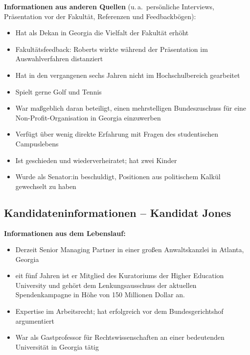 \textbf{Informationen aus anderen Quellen}
(u.\,a.\ persönliche Interviews, Präsentation vor der Fakultät, Referenzen und Feedbackbögen):
\begin{itemize}
  \item Hat als Dekan in Georgia die Vielfalt der Fakultät erhöht
  \item Fakultätsfeedback: Roberts wirkte während der Präsentation im Auswahlverfahren distanziert
  \item Hat in den vergangenen sechs Jahren nicht im Hochschulbereich gearbeitet
  \item Spielt gerne Golf und Tennis
  \item War maßgeblich daran beteiligt, einen mehrstelligen Bundeszuschuss für eine Non-Profit-Organisation
    in Georgia einzuwerben
  \item Verfügt über wenig direkte Erfahrung mit Fragen des studentischen Campuslebens
  \item Ist geschieden und wiederverheiratet; hat zwei Kinder
  \item Wurde als Senator:in beschuldigt, Positionen aus politischem Kalkül gewechselt zu haben
\end{itemize}

\clearpage
\subsection*{Kandidateninformationen -- Kandidat Jones}
\thispagestyle{empty}

\textbf{Informationen aus dem Lebenslauf:}
\begin{itemize}
  \item Derzeit Senior Managing Partner in einer großen Anwaltskanzlei in Atlanta, Georgia
  \item eit fünf Jahren ist er Mitglied des Kuratoriums der Higher Education University
    und gehört dem Lenkungsausschuss der aktuellen Spendenkampagne in Höhe von
    150 Millionen Dollar an.
  \item Expertise im Arbeitsrecht; hat erfolgreich vor dem Bundesgerichtshof argumentiert
  \item War als Gastprofessor für Rechtswissenschaften an einer bedeutenden Universität in
    Georgia tätig
\end{itemize}

